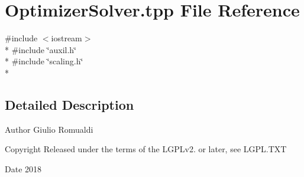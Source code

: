 \section{Optimizer\+Solver.\+tpp File Reference}
\label{OptimizerSolver_8tpp}
{\ttfamily \#include $<$iostream$>$}\\*
{\ttfamily \#include \char`\"{}auxil.\+h\char`\"{}}\\*
{\ttfamily \#include \char`\"{}scaling.\+h\char`\"{}}\\*


\subsection{Detailed Description}
\begin{DoxyAuthor}{Author}
Giulio Romualdi 
\end{DoxyAuthor}
\begin{DoxyCopyright}{Copyright}
Released under the terms of the L\+G\+P\+Lv2. or later, see L\+G\+P\+L.\+T\+XT 
\end{DoxyCopyright}
\begin{DoxyDate}{Date}
2018 
\end{DoxyDate}
